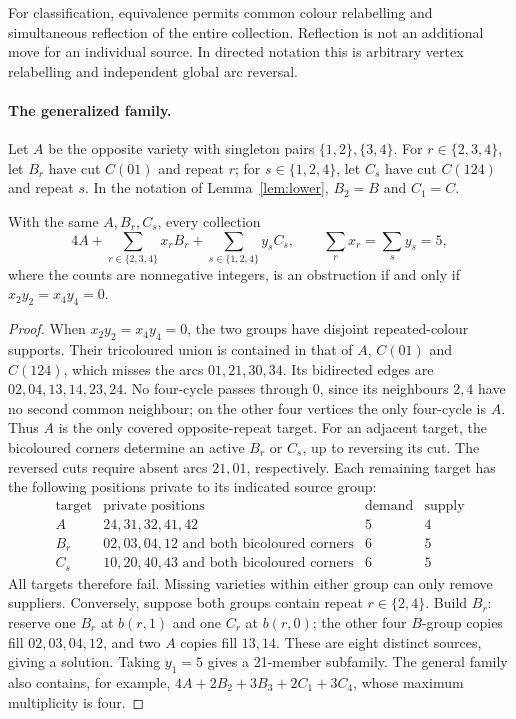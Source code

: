 For classification, equivalence permits common colour relabelling and
simultaneous reflection of the entire collection. Reflection is not an
additional move for an individual source. In directed notation this is
arbitrary vertex relabelling and independent global arc reversal.

\paragraph{The generalized family.}
Let $A$ be the opposite variety with singleton pairs $\{1,2\},\{3,4\}$.
For $r\in\{2,3,4\}$, let $B_r$ have cut $C(01)$ and repeat $r$;
for $s\in\{1,2,4\}$, let $C_s$ have cut $C(124)$ and repeat $s$.
In the notation of Lemma~\ref{lem:lower}, $B_2=B$ and $C_1=C$.

\begin{samepage}
\begin{corollary}\label{cor:extremal-family}
With the same $A,B_r,C_s$, every collection
\[
 4A+\sum_{r\in\{2,3,4\}}x_rB_r+\sum_{s\in\{1,2,4\}}y_sC_s,
 \qquad \sum_r x_r=\sum_s y_s=5,
\]
where the counts are nonnegative integers, is an obstruction if and only if
$x_2y_2=x_4y_4=0$.
\end{corollary}
\end{samepage}
\begin{proof}
When $x_2y_2=x_4y_4=0$, the two groups have disjoint repeated-colour supports.
Their tricoloured union is contained in that of $A$, $C(01)$ and $C(124)$,
which misses the arcs $01,21,30,34$. Its bidirected edges are
$02,04,13,14,23,24$. No four-cycle passes through $0$, since its neighbours
$2,4$ have no second common neighbour; on the other four vertices the only
four-cycle is $A$. Thus $A$ is the only covered opposite-repeat target.
For an adjacent target, the bicoloured corners determine an active $B_r$ or
$C_s$, up to reversing its cut. The reversed cuts require absent arcs
$21,01$, respectively. Each remaining target has the following positions
private to its indicated source group:
\[
\begin{array}{c|l|c|c}
 \text{target}&\text{private positions}&\text{demand}&\text{supply}\\\hline
 A&24,31,32,41,42&5&4\\
 B_r&02,03,04,12\text{ and both bicoloured corners}&6&5\\
 C_s&10,20,40,43\text{ and both bicoloured corners}&6&5
\end{array}
\]
All targets therefore fail. Missing varieties within either group can only
remove suppliers.
Conversely, suppose both groups contain repeat $r\in\{2,4\}$. Build $B_r$:
reserve one $B_r$ at $b(r,1)$ and one $C_r$ at $b(r,0)$; the other four
$B$-group copies fill $02,03,04,12$, and two $A$ copies fill $13,14$.
These are eight distinct sources, giving a solution.
Taking $y_1=5$ gives a 21-member
subfamily. The general family also contains, for example,
$4A+2B_2+3B_3+2C_1+3C_4$, whose maximum multiplicity is four.
\end{proof}

